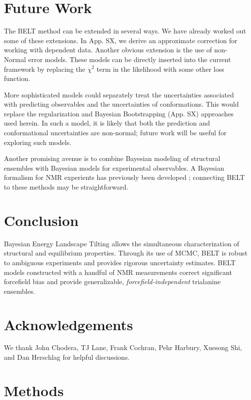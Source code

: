 \documentclass[journal=jacsat,manuscript=article]{achemso}
\begin{document}
\section{Future Work}

The BELT method can be extended in several ways.  We have already worked out some of these extensions.  In App. SX, we derive an approximate correction for working with dependent data.  Another obvious extension is the use of non-Normal error models.  These models can be directly inserted into the current framework by replacing the $\chi^2$ term in the likelihood with some other loss function.  

More sophisticated models could separately treat the uncertainties associated with predicting observables and the uncertainties of conformations.  This would replace the regularization and Bayesian Bootstrapping (App. SX) approaches used herein.  In such a model, it is likely that both the prediction and conformational uncertainties are non-normal; future work will be useful for exploring such models.  

Another promising avenue is to combine Bayesian modeling of structural ensembles with Bayesian models for experimental observables.  A Bayesian formalism for NMR experients has previously been developed \cite{rieping2005, habeck2006}; connecting BELT to these methods may be straightforward.  


\section{Conclusion}

Bayesian Energy Landscape Tilting allows the simultaneous characterization of structural and equilibrium properties.  Through its use of MCMC, BELT is robust to ambiguous experiments and provides rigorous uncertainty estimates.  BELT models constructed with a handful of NMR measurements correct significant forcefield bias and provide generalizable, \emph{forcefield-independent} trialanine ensembles.  


\section{Acknowledgements}

We thank John Chodera, TJ Lane, Frank Cochran, Pehr Harbury, Xuesong Shi, and Dan Herschlag for helpful discussions.  

\section{Methods}
\end{document}
